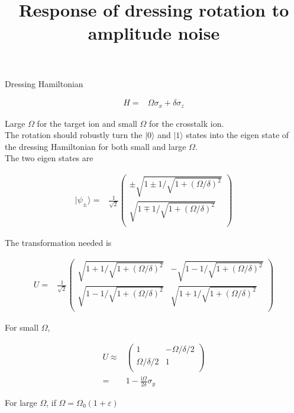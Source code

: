\documentclass[10pt,fleqn]{article}
\title{Response of dressing rotation to amplitude noise}
\newcommand{\ui}{\mathrm{i}}
\newcommand{\eqar}[1]
{
  \begin{align*}
    #1
  \end{align*}
}
\begin{document}
\maketitle

Dressing Hamiltonian
\eqar{
  H=&\Omega\sigma_x+\delta\sigma_z
}
Large $\Omega$ for the target ion and small $\Omega$ for the crosstalk ion.\\

The rotation should robustly turn the $|0\rangle$ and $|1\rangle$ states into
the eigen state of the dressing Hamiltonian for both small and large $\Omega$.\\

The two eigen states are
\eqar{
  |\psi_\pm\rangle=&\frac1{\sqrt2}\begin{pmatrix}
    \pm\sqrt{1\pm1/\sqrt{1 + (\Omega/\delta)^2}}\\
    \sqrt{1\mp1/\sqrt{1 + (\Omega/\delta)^2}}\\
  \end{pmatrix}
}
The transformation needed is
\eqar{
  U=&\frac1{\sqrt2}\begin{pmatrix}
    \sqrt{1+1/\sqrt{1 + (\Omega/\delta)^2}}&-\sqrt{1-1/\sqrt{1 + (\Omega/\delta)^2}}\\
    \sqrt{1-1/\sqrt{1 + (\Omega/\delta)^2}}&\sqrt{1+1/\sqrt{1 + (\Omega/\delta)^2}}\\
  \end{pmatrix}
}
For small $\Omega$,
\eqar{
  U\approx&\begin{pmatrix}
    1&-\Omega/\delta / 2\\
    \Omega/\delta / 2&1\\
  \end{pmatrix}\\
  =&1-\frac{\ui\Omega}{2\delta}\sigma_y
}
For large $\Omega$, if $\Omega=\Omega_0(1+\varepsilon)$
\end{document}
